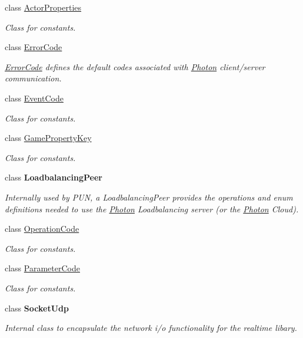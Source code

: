 \begin{DoxyCompactItemize}
\item 
class \hyperlink{class_exit_games_1_1_client_1_1_photon_1_1_actor_properties}{Actor\+Properties}
\begin{DoxyCompactList}\small\item\em Class for constants. \end{DoxyCompactList}\item 
class \hyperlink{class_exit_games_1_1_client_1_1_photon_1_1_error_code}{Error\+Code}
\begin{DoxyCompactList}\small\item\em \hyperlink{class_exit_games_1_1_client_1_1_photon_1_1_error_code}{Error\+Code} defines the default codes associated with \hyperlink{namespace_exit_games_1_1_client_1_1_photon}{Photon} client/server communication. \end{DoxyCompactList}\item 
class \hyperlink{class_exit_games_1_1_client_1_1_photon_1_1_event_code}{Event\+Code}
\begin{DoxyCompactList}\small\item\em Class for constants. \end{DoxyCompactList}\item 
class \hyperlink{class_exit_games_1_1_client_1_1_photon_1_1_game_property_key}{Game\+Property\+Key}
\begin{DoxyCompactList}\small\item\em Class for constants. \end{DoxyCompactList}\item 
class {\bfseries Loadbalancing\+Peer}
\begin{DoxyCompactList}\small\item\em Internally used by P\+UN, a Loadbalancing\+Peer provides the operations and enum definitions needed to use the \hyperlink{namespace_exit_games_1_1_client_1_1_photon}{Photon} Loadbalancing server (or the \hyperlink{namespace_exit_games_1_1_client_1_1_photon}{Photon} Cloud). \end{DoxyCompactList}\item 
class \hyperlink{class_exit_games_1_1_client_1_1_photon_1_1_operation_code}{Operation\+Code}
\begin{DoxyCompactList}\small\item\em Class for constants. \end{DoxyCompactList}\item 
class \hyperlink{class_exit_games_1_1_client_1_1_photon_1_1_parameter_code}{Parameter\+Code}
\begin{DoxyCompactList}\small\item\em Class for constants. \end{DoxyCompactList}\item 
class {\bfseries Socket\+Udp}
\begin{DoxyCompactList}\small\item\em Internal class to encapsulate the network i/o functionality for the realtime libary.\end{DoxyCompactList}\end{DoxyCompactItemize}
